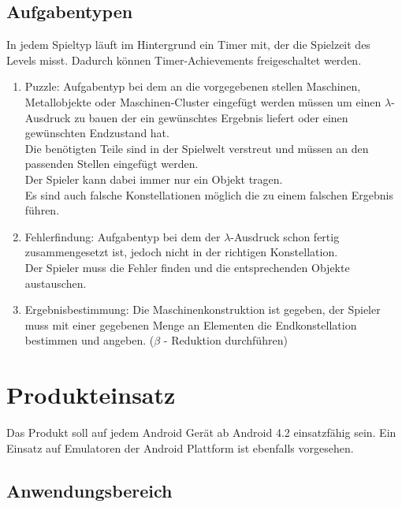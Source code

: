 \documentclass{scrartcl}
\begin{document}
\subsection{Aufgabentypen}
In jedem Spieltyp läuft im Hintergrund ein Timer mit, der die Spielzeit des Levels misst. Dadurch können Timer-Achievements freigeschaltet werden.
\begin{enumerate}
	\item \label{aufgabentyp:puzzle} Puzzle: Aufgabentyp bei dem an die vorgegebenen stellen Maschinen, Metallobjekte oder Maschinen-Cluster eingefügt werden müssen um einen $\lambda$-Ausdruck zu bauen der ein gewünschtes Ergebnis liefert oder einen gewünschten Endzustand hat.\\
	Die benötigten Teile sind in der Spielwelt verstreut und müssen an den passenden Stellen eingefügt werden.\\
	Der Spieler kann dabei immer nur ein Objekt tragen.\\
	Es sind auch falsche Konstellationen möglich die zu einem falschen Ergebnis führen.\\
	\item \label{aufgabentyp:fehlerfindung} Fehlerfindung: Aufgabentyp bei dem der $\lambda$-Ausdruck schon fertig zusammengesetzt ist, jedoch nicht in der richtigen Konstellation.\\
	Der Spieler muss die Fehler finden und die entsprechenden Objekte austauschen.\\
	\item \label{aufgabentyp:ergebnis} Ergebnisbestimmung: Die Maschinenkonstruktion ist gegeben, der Spieler muss mit einer gegebenen Menge an Elementen die Endkonstellation bestimmen und angeben. ($\beta$ - Reduktion durchführen) 
\end{enumerate}

\clearpage









\section{Produkteinsatz}

Das Produkt soll auf jedem Android Gerät ab Android 4.2 einsatzfähig sein. Ein Einsatz auf Emulatoren der Android Plattform ist ebenfalls vorgesehen.

\subsection{Anwendungsbereich}
\end{document}
